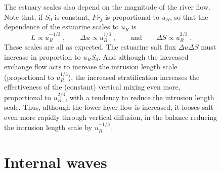 \documentclass[11pt]{report}
\numberwithin{equation}{section}
\begin{document}
\begin{figure}
The estuary scales also depend on the magnitude of the river flow.  Note that, if $S_0$ is constant, $Fr_f$ is proportional to $u_R$, so that the dependence of the estuarine scales to $u_R$ is
\begin{equation}
    L \propto u_R^{-1/3} \; , \qquad \Delta u \propto u_R^{1/3} \;, \qquad \mathrm{and} \qquad \Delta S \propto u_R^{2/3}   \;.
\end{equation}
These scales are all as expected.  The estuarine salt flux $\Delta u \Delta S$ must increase in proportion to $u_R S_0$.  And although the increased exchange flow acts to increase the intrusion length scale (proportional to $u_R^{1/3}$), the increased stratification increases the effectiveness of the (constant) vertical mixing even more, proportional to $u_R^{2/3}$, with a tendency to reduce the intrusion length scale.  Thus, although the lower layer flow is increased, it looses salt even more rapidly through vertical diffusion, in the balance reducing the intrusion length scale by $u_R^{-1/3}$.





\section{Internal waves}


\end{figure}
\end{document}
